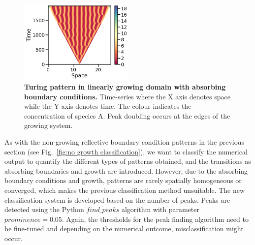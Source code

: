 \begin{figure}[H] %
    \centering
    \begin{adjustbox}{center}
        \includegraphics[width=0.5\textwidth]{chapters/Chapter 1/growing_pattern} %
    \end{adjustbox}
    \caption{\textbf{Turing pattern in linearly growing domain with absorbing boundary conditions.} Time-series where the X axis denotes space while the Y axis denotes time. The colour indicates the concentration of species A. Peak doubling occurs at the edges of the growing system.}
    \label{fig:growing_pattern} %
\end{figure}

As with the non-growing reflective boundary condition patterns in the previous section (see Fig.~\ref{fig:no growth classification}), we want to classify the numerical output to quantify the different types of patterns obtained, and the transitions as absorbing boundaries and growth are introduced.
However, due to the absorbing boundary conditions and growth, patterns are rarely spatially homogeneous or converged, which makes the previous classification method unsuitable.
The new classification system is developed based on the number of peaks.
Peaks are detected using the Python $find\_peaks$ algorithm with parameter $prominence=0.05$.
Again, the thresholds for the peak finding algorithm need to be fine-tuned and depending on the numerical outcome, misclassification might occur.



